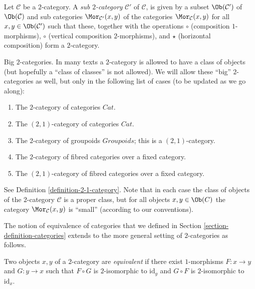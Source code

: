 \begin{definition}
\label{definition-sub-2-category}
Let $\mathcal{C}$ be a $2$-category.
A {\it sub $2$-category} $\mathcal{C}'$ of $\mathcal{C}$, is given by a subset
$\Ob(\mathcal{C}')$ of $\Ob(\mathcal{C})$
and sub categories $\Mor_{\mathcal{C}'}(x, y)$ of the
categories $\Mor_\mathcal{C}(x, y)$ for all
$x, y \in \Ob(\mathcal{C}')$ such that these, together with
the operations $\circ$ (composition $1$-morphisms), $\circ$ (vertical
composition $2$-morphisms), and $\star$ (horizontal composition)
form a $2$-category.
\end{definition}

\begin{remark}
\label{remark-big-2-categories}
Big $2$-categories.
In many texts a $2$-category is allowed to have a class of
objects (but hopefully a ``class of classes'' is not allowed).
We will allow these ``big'' $2$-categories as well, but only
in the following list of cases (to be updated as we go along):
\begin{enumerate}
\item The $2$-category of categories $\textit{Cat}$.
\item The $(2, 1)$-category of categories $\textit{Cat}$.
\item The $2$-category of groupoids $\textit{Groupoids}$;
this is a $(2, 1)$-category.
\item The $2$-category of fibred categories over a fixed category.
\item The $(2, 1)$-category of fibred categories over a fixed category.
\end{enumerate}
See Definition \ref{definition-2-1-category}.
Note that in each case the class of objects of the $2$-category
$\mathcal{C}$ is a proper class, but for all objects $x, y \in \Ob(C)$
the category $\Mor_\mathcal{C}(x, y)$ is ``small'' (according to
our conventions).
\end{remark}

\noindent
The notion of equivalence of categories that we defined in Section
\ref{section-definition-categories} extends to the more general setting of
$2$-categories as follows.

\begin{definition}
\label{definition-equivalence}
Two objects $x, y$ of a $2$-category are {\it equivalent} if there exist
$1$-morphisms $F : x \to y$ and $G : y \to x$ such that $F \circ G$ is
$2$-isomorphic to $\text{id}_y$ and $G \circ F$ is $2$-isomorphic to
$\text{id}_x$.
\end{definition}

